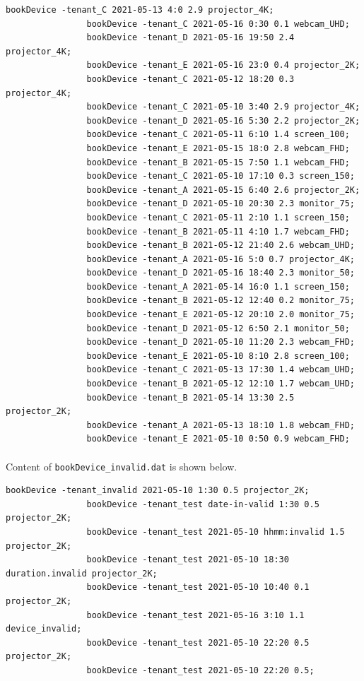 \documentclass{article}
\begin{document}
\begin{Verbatim}[gobble=8]
                bookDevice -tenant_C 2021-05-13 4:0 2.9 projector_4K;
                bookDevice -tenant_C 2021-05-16 0:30 0.1 webcam_UHD;
                bookDevice -tenant_D 2021-05-16 19:50 2.4 projector_4K;
                bookDevice -tenant_E 2021-05-16 23:0 0.4 projector_2K;
                bookDevice -tenant_C 2021-05-12 18:20 0.3 projector_4K;
                bookDevice -tenant_C 2021-05-10 3:40 2.9 projector_4K;
                bookDevice -tenant_D 2021-05-16 5:30 2.2 projector_2K;
                bookDevice -tenant_C 2021-05-11 6:10 1.4 screen_100;
                bookDevice -tenant_E 2021-05-15 18:0 2.8 webcam_FHD;
                bookDevice -tenant_B 2021-05-15 7:50 1.1 webcam_FHD;
                bookDevice -tenant_C 2021-05-10 17:10 0.3 screen_150;
                bookDevice -tenant_A 2021-05-15 6:40 2.6 projector_2K;
                bookDevice -tenant_D 2021-05-10 20:30 2.3 monitor_75;
                bookDevice -tenant_C 2021-05-11 2:10 1.1 screen_150;
                bookDevice -tenant_B 2021-05-11 4:10 1.7 webcam_FHD;
                bookDevice -tenant_B 2021-05-12 21:40 2.6 webcam_UHD;
                bookDevice -tenant_A 2021-05-16 5:0 0.7 projector_4K;
                bookDevice -tenant_D 2021-05-16 18:40 2.3 monitor_50;
                bookDevice -tenant_A 2021-05-14 16:0 1.1 screen_150;
                bookDevice -tenant_B 2021-05-12 12:40 0.2 monitor_75;
                bookDevice -tenant_E 2021-05-12 20:10 2.0 monitor_75;
                bookDevice -tenant_D 2021-05-12 6:50 2.1 monitor_50;
                bookDevice -tenant_D 2021-05-10 11:20 2.3 webcam_FHD;
                bookDevice -tenant_E 2021-05-10 8:10 2.8 screen_100;
                bookDevice -tenant_C 2021-05-13 17:30 1.4 webcam_UHD;
                bookDevice -tenant_B 2021-05-12 12:10 1.7 webcam_UHD;
                bookDevice -tenant_B 2021-05-14 13:30 2.5 projector_2K;
                bookDevice -tenant_A 2021-05-13 18:10 1.8 webcam_FHD;
                bookDevice -tenant_E 2021-05-10 0:50 0.9 webcam_FHD;
            \end{Verbatim}
            \paragraph{}
                Content of \texttt{bookDevice\_invalid.dat} is shown below.
            \begin{Verbatim}[gobble=8]
                bookDevice -tenant_invalid 2021-05-10 1:30 0.5 projector_2K;
                bookDevice -tenant_test date-in-valid 1:30 0.5 projector_2K;
                bookDevice -tenant_test 2021-05-10 hhmm:invalid 1.5 projector_2K;
                bookDevice -tenant_test 2021-05-10 18:30 duration.invalid projector_2K;
                bookDevice -tenant_test 2021-05-10 10:40 0.1 projector_2K;
                bookDevice -tenant_test 2021-05-16 3:10 1.1 device_invalid;
                bookDevice -tenant_test 2021-05-10 22:20 0.5 projector_2K;
                bookDevice -tenant_test 2021-05-10 22:20 0.5;
            \end{Verbatim}
\end{document}
